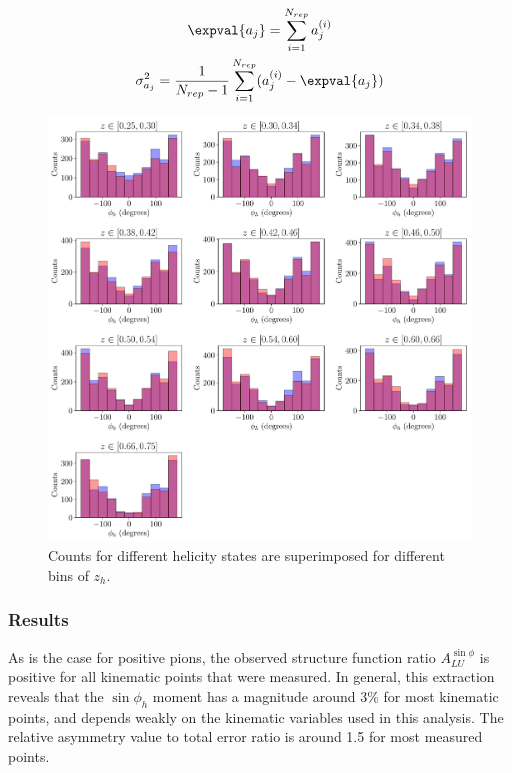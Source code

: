 \begin{gather}
  \expval{a_j} = \sum_{i=1}^{N_{rep}} a_{j}^{(i)} \\
  \sigma_{a_j}^{2} = \frac{1}{N_{rep}-1} \sum_{i=1}^{N_{rep}} (a_{j}^{(i)} - \expval{a_j}) 
\end{gather}


\begin{figure}
	\centering
	\includegraphics[width=16cm]{image/plots/kaon-bsa/z-phi-counts.pdf}
	\caption{Counts for different helicity states are superimposed for different bins of $z_h$.}
\end{figure}

\subsubsection*{Results}
%
%
As is the case for positive pions, the observed structure function ratio $A_{LU}^{\sin\phi}$ is positive for all kinematic points that were measured.  In general, this extraction reveals that the $\sin\phi_h$ moment has a magnitude around 3\% for most kinematic points, and depends weakly on the kinematic variables used in this analysis.  The relative asymmetry value to total error ratio is around 1.5 for most measured points.

